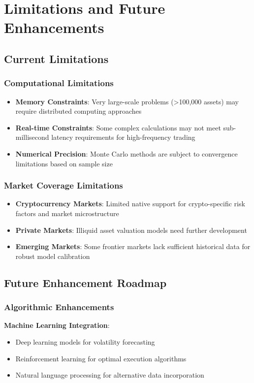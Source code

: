 \documentclass[12pt,a4paper]{article}
\theoremstyle{definition}
\theoremstyle{remark}
\begin{document}
\section{Limitations and Future Enhancements}

\subsection{Current Limitations}

\subsubsection{Computational Limitations}
\begin{itemize}
    \item \textbf{Memory Constraints}: Very large-scale problems (>100,000 assets) may require distributed computing approaches
    \item \textbf{Real-time Constraints}: Some complex calculations may not meet sub-millisecond latency requirements for high-frequency trading
    \item \textbf{Numerical Precision}: Monte Carlo methods are subject to convergence limitations based on sample size
\end{itemize}

\subsubsection{Market Coverage Limitations}
\begin{itemize}
    \item \textbf{Cryptocurrency Markets}: Limited native support for crypto-specific risk factors and market microstructure
    \item \textbf{Private Markets}: Illiquid asset valuation models need further development
    \item \textbf{Emerging Markets}: Some frontier markets lack sufficient historical data for robust model calibration
\end{itemize}

\subsection{Future Enhancement Roadmap}

\subsubsection{Algorithmic Enhancements}
\textbf{Machine Learning Integration}:
\begin{itemize}
    \item Deep learning models for volatility forecasting
    \item Reinforcement learning for optimal execution algorithms
    \item Natural language processing for alternative data incorporation
\end{itemize}
\end{document}
